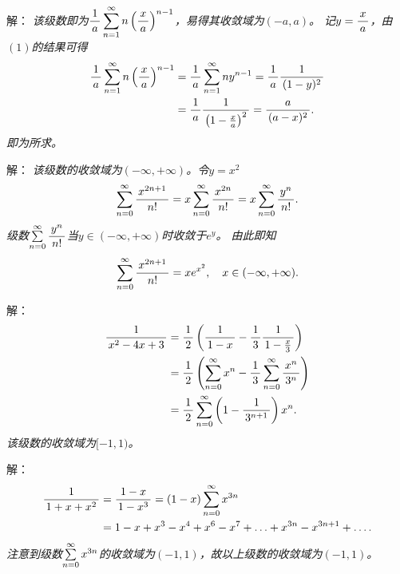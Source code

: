 \begin{frame}
	\linespread{1.5}
	
	\bigskip
	
	\small 解：\it
	该级数即为$\df1a\sumn n\left(\df xa\right)^{n-1}$，易得其收敛域为$(-a,a)$。
	记$y=\df xa$，由$(1)$的结果可得
	\begin{align*}
		\df1a\sumn n\left(\df xa\right)^{n-1}
		&=\df1a\sumn ny^{n-1}=\df1a\df1{(1-y)^2}\\
		&=\df1a\df1{\left(1-\frac
		xa\right)^2} =\df{a}{(a-x)^2}.
	\end{align*}
	即为所求。
\end{frame}

\begin{frame}
	\linespread{1.5}
	
	\bigskip
	
	\small 解：\it
	该级数的收敛域为$(-\infty,+\infty)$。令$y=x^2$
	$$\sumn[0]\df{x^{2n+1}}{n!}=x\sumn[0]\df{x^{2n}}{n!}
	=x\sumn[0]\df{y^n}{n!}.$$
	级数$\sumn[0]\df{y^n}{n!}$当$y\in(-\infty,+\infty)$时收敛于$e^y$。
	由此即知
	$$\sumn[0]\df{x^{2n+1}}{n!}=xe^{x^2},\quad x\in(-\infty,+\infty).$$
	\fin
\end{frame}

\begin{frame}
	\linespread{1.5}
	
	\bigskip
	
	\small 解：\it
	\begin{align*}
		\df1{x^2-4x+3}&=\df12\left(\df1{1-x}-\df13\df1{1-\frac x3}\right)\\
		&=\df12\left(\sumn[0]x^n-\df13\sumn[0]\df{x^n}{3^n}\right)\\
		&=\df12\sumn[0]\left(1-\df1{3^{n+1}}\right)x^n.
	\end{align*}
	该级数的收敛域为$[-1,1)$。
\end{frame}

\begin{frame}
	\linespread{1.5}
	
	\bigskip
	
	\small 解：\it
	\begin{align*}
		\df 1{1+x+x^2}
		&=\df{1-x}{1-x^3}=(1-x)\sumn[0]x^{3n}\\
		&=1-x+x^3-x^4+x^6-x^7+\ldots+x^{3n}-x^{3n+1}+\ldots.
	\end{align*}
	注意到级数$\sumn[0]x^{3n}$的收敛域为$(-1,1)$，故以上级数的收敛域为$(-1,1)$。\fin
\end{frame}

